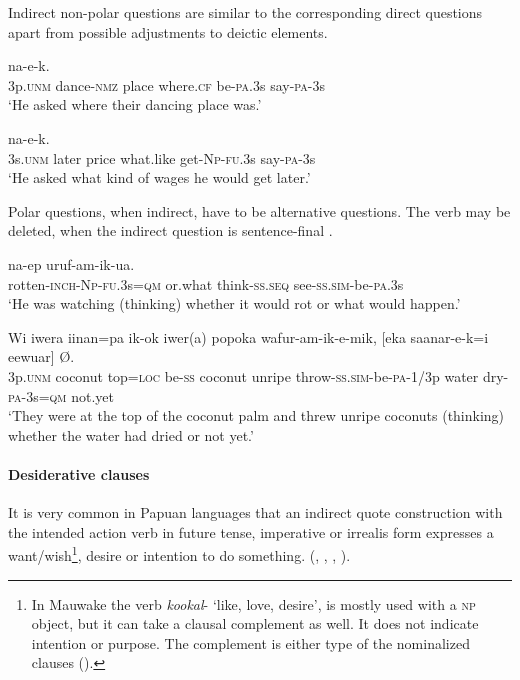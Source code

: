 Indirect non-polar questions are similar to the corresponding direct questions apart from possible adjustments to deictic elements.

\ea%
\label{ex:8:x1592}
  na-e-k.\\
3p.\textsc{unm} dance-\textsc{nmz} place where.\textsc{cf} be-\textsc{pa}.3s say-\textsc{pa}-3s\\
\glt`He asked where their dancing place was.'
\z


\ea%
\label{ex:8:x1590}
  na-e-k.\\
3s.\textsc{unm} later  price  what.like  get-\textsc{Np}-\textsc{fu}.3s  say-\textsc{pa}-3s\\
\glt`He asked what kind of wages he would get later.'
\z


Polar questions, when indirect, have to be alternative questions. The verb  may be deleted, when the indirect question is sentence-final . 

\ea%
\label{ex:8:x1591}
\gll [Beel-al-i-non=i  kamenion]  na-ep uruf-am-ik-ua.\\
rotten-\textsc{inch}-\textsc{Np}-\textsc{fu}.3s=\textsc{qm} or.what  think-\textsc{ss}.\textsc{seq} see-\textsc{ss}.\textsc{sim}-be-\textsc{pa}.3s\\
\glt`He was watching (thinking) whether it would rot or what would happen.'
\z


\ea%
\label{ex:8:x1593}
\gll Wi  iwera  iinan=pa  ik-ok  iwer(a)  popoka wafur-am-ik-e-mik,  [eka  saanar-e-k=i  eewuar] {\O}. \\
3p.\textsc{unm} coconut top=\textsc{loc} be-\textsc{ss} coconut unripe throw-\textsc{ss}.\textsc{sim}-be-\textsc{pa}-1/3p water dry-\textsc{pa}-3s=\textsc{qm} not.yet\\
\glt`They were at the top of the coconut palm and threw unripe coconuts (thinking) whether the water had dried or not yet.'
\z


\paragraph[Desiderative clauses]{Desiderative clauses}\label{sec:8.3.2.1.3}

It is very common in Papuan languages that an indirect quote construction with the intended action verb in future tense, imperative or irrealis form expresses a want/wish\footnote{In Mauwake the verb \textit{kookal}- `like, love, desire', is mostly used with a \textsc{np} object, but it can take a clausal complement as well. It does not indicate intention or purpose. The complement is either type of the nominalized clauses ().}, desire or intention to do something. (\citealt[254--259]{Reesink1987}, \citealt[157]{Foley1986}, \citealt[112]{Hardin2003}, \citealt[76--77]{Hepner2002}).

